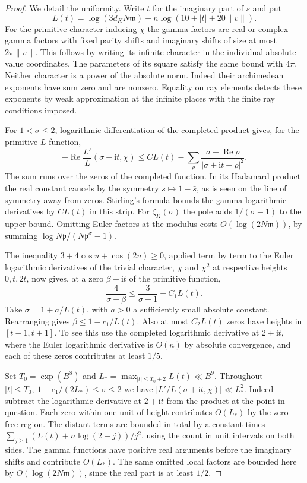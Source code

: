 \documentclass[a4paper,11pt]{article}
\theoremstyle{definition}
\theoremstyle{remark}
\numberwithin{equation}{section}
\begin{document}
\begin{proof}
We detail the uniformity. Write \(t\) for the imaginary part of \(s\)
and put
\[
  L(t)=\log(3d_K N\mathfrak m)+
             n\log(10+|t|+20\|v\|).
\]
For the primitive character inducing \(\chi\) the gamma factors are
real or complex gamma factors with fixed parity shifts and imaginary
shifts of size at most \(2\pi\|v\|\). This follows by writing its
infinite character in the individual absolute-value coordinates.
The parameters of its square satisfy the same bound with \(4\pi\).
Neither character is a power of the absolute norm. Indeed their
archimedean exponents have sum zero and are nonzero. Equality on
ray elements detects these exponents by weak approximation at the
infinite places with the finite ray conditions imposed.

For \(1<\sigma\le2\), logarithmic differentiation of the completed
product gives, for the primitive \(L\)-function,
\[
 -\operatorname{Re}\frac{L'}{L}(\sigma+\mathrm it,\chi)
 \le C L(t)-\sum_\rho
       \frac{\sigma-\operatorname{Re}\rho}{|\sigma+\mathrm it-\rho|^2}.
\]
The sum runs over the zeros of the completed function. In its
Hadamard product the real constant cancels by the symmetry
\(s\mapsto1-\bar s\), as is seen on the line of symmetry away
from zeros. Stirling's formula bounds the gamma logarithmic
derivatives by \(CL(t)\) in this strip. For \(\zeta_K(\sigma)\)
the pole adds \(1/(\sigma-1)\) to the upper bound. Omitting Euler
factors at the modulus costs \(O(\log(2N\mathfrak m))\), by summing
\(\log N\mathfrak p/(N\mathfrak p^\sigma-1)\).

The inequality \(3+4\cos u+\cos(2u)\ge0\), applied term by term
to the Euler logarithmic derivatives of the trivial character,
\(\chi\) and \(\chi^2\) at respective heights \(0,t,2t\), now
gives, at a zero \(\beta+\mathrm it\) of the primitive function,
\[
         \frac4{\sigma-\beta}\le\frac3{\sigma-1}+C_1 L(t).
\]
Take \(\sigma=1+a/L(t)\), with \(a>0\) a sufficiently small
absolute constant. Rearranging gives \(\beta\le1-c_1/L(t)\).
Also at most \(C_2L(t)\) zeros have heights in \([t-1,t+1]\).
To see this use the completed logarithmic derivative at \(2+\mathrm
it\), where the Euler logarithmic derivative is \(O(n)\) by absolute
convergence, and each of these zeros contributes at least \(1/5\).

Set \(T_0=\exp(B^8)\) and \(L_*=\max_{|t|\le T_0+2}L(t)\ll B^9\).
Throughout \(|t|\le T_0,\ 1-c_1/(2L_*)\le\sigma\le2\) we have
\(|L'/L(\sigma+\mathrm it,\chi)|\ll L_*^2\).
Indeed subtract the logarithmic derivative at \(2+\mathrm it\)
from the product at the point in question. Each zero within one
unit of height contributes \(O(L_*)\) by the zero-free region.
The distant terms are bounded in total by a constant times
\(\sum_{j\ge1}(L(t)+n\log(2+j))/j^2\), using the count in unit
intervals on both sides. The gamma functions have positive real
arguments before the imaginary shifts and contribute \(O(L_*)\).
The same omitted local factors are bounded here by \(O(\log(2N\mathfrak m))\),
since the real part is at least \(1/2\).


\end{proof}
\end{document}
